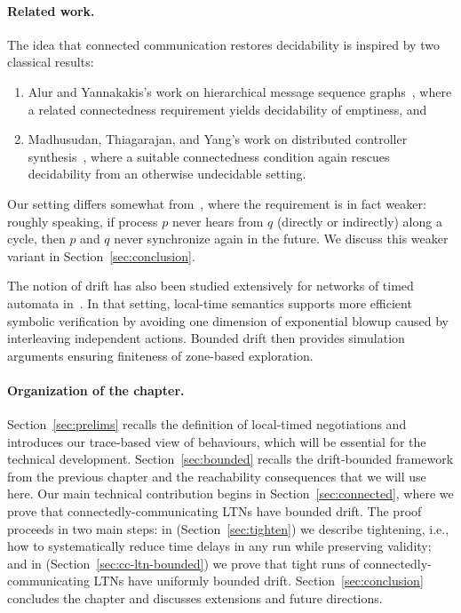 \paragraph*{Related work.}
The idea that connected communication restores decidability is inspired by two classical results:
\begin{enumerate}
    \item Alur and Yannakakis's work on hierarchical message sequence graphs~\cite{DBLP:conf/concur/AlurY99}, where a related connectedness requirement yields decidability of emptiness, and
    \item Madhusudan, Thiagarajan, and Yang's work on distributed controller synthesis~\cite{DBLP:conf/fsttcs/MadhusudanTY05}, where a suitable connectedness condition again rescues decidability from an otherwise undecidable setting.
\end{enumerate}

Our setting differs somewhat from~\cite{DBLP:conf/fsttcs/MadhusudanTY05}, where the requirement is in fact weaker: roughly speaking, if process $p$ never hears from $q$ (directly or indirectly) along a cycle, then $p$ and $q$ never synchronize again in the future. We discuss this weaker variant in Section~\ref{sec:conclusion}.

The notion of drift has also been studied extensively for networks of timed automata in~\cite{DBLP:conf/lics/0001HSW22,DBLP:conf/concur/HerbreteauSW22}. In that setting, local-time semantics supports more efficient symbolic verification by avoiding one dimension of exponential blowup caused by interleaving independent actions. Bounded drift then provides simulation arguments ensuring finiteness of zone-based exploration.

\paragraph*{Organization of the chapter.}
Section~\ref{sec:prelims} recalls the definition of local-timed negotiations and introduces our trace-based view of behaviours, which will be essential for the technical development. Section~\ref{sec:bounded} recalls the drift-bounded framework from the previous chapter and the reachability consequences that we will use here. Our main technical contribution begins in Section~\ref{sec:connected}, where we prove that connectedly-communicating LTNs have bounded drift. The proof proceeds in two main steps: in (Section~\ref{sec:tighten}) we describe tightening, i.e., how to systematically reduce time delays in any run while preserving validity; and in (Section~\ref{sec:cc-ltn-bounded}) we prove that tight runs of connectedly-communicating LTNs have uniformly bounded drift.
Section~\ref{sec:conclusion} concludes the chapter and discusses extensions and future directions.

